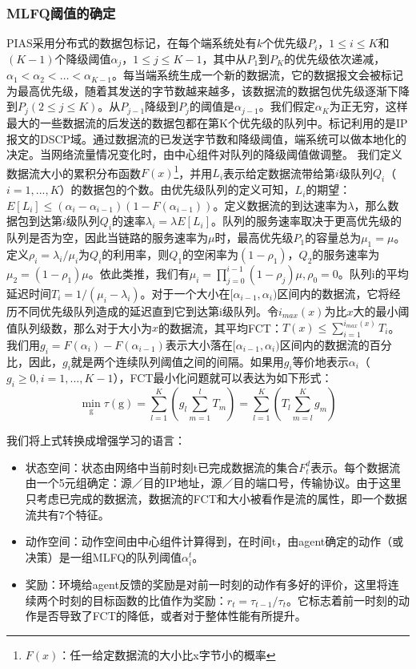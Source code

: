 \subsubsection{MLFQ阈值的确定}
PIAS采用分布式的数据包标记，在每个端系统处有$k$个优先级$P_i$，$1 \leq i \leq K$和$(K-1)$个降级阈值$\alpha_j$，$1 \leq j \leq K-1$，其中从$P_1$到$P_K$的优先级依次递减，$\alpha_1 < \alpha_2 < … < \alpha_{K-1}$。每当端系统生成一个新的数据流，它的数据报文会被标记为最高优先级，随着其发送的字节数越来越多，该数据流的数据包优先级逐渐下降到$P_j (2 \leq j \leq K)$。从$P_{j-1}$降级到$P_j$的阈值是$\alpha_{j-1}$。我们假定$\alpha_K$为正无穷，这样最大的一些数据流的后发送的数据包都在第K个优先级的队列中。标记利用的是IP报文的DSCP域。通过数据流的已发送字节数和降级阈值，端系统可以做本地化的决定。当网络流量情况变化时，由中心组件对队列的降级阈值做调整。
我们定义数据流大小的累积分布函数$F(x)$\footnote{$F(x)$：任一给定数据流的大小比x字节小的概率}，并用$L_i$表示给定数据流带给第$i$级队列$Q_i$（$i = 1, ..., K$）的数据包的个数。由优先级队列的定义可知，$L_i$的期望：$E[L_i] \leq (\alpha_i - \alpha_{i-1})(1-F(\alpha_{i-1}))$。定义数据流的到达速率为$\lambda$，那么数据包到达第$i$级队列$Q_i$的速率$\lambda_i = \lambda E[L_i]$。队列的服务速率取决于更高优先级的队列是否为空，因此当链路的服务速率为$\mu$时，最高优先级$P_1$的容量总为$\mu_1 = \mu$。定义$\rho_i = \lambda_i / \mu_i$为$Q_i$的利用率，则$Q_1$的空闲率为$(1-\rho_1)$，$Q_2$的服务速率为$\mu_2 = (1-\rho_1)\mu$。依此类推，我们有$\mu_i = \prod_{j=0}^{i-1} (1-\rho_j) \mu, \rho_0 = 0$。队列i的平均延迟时间$T_i = 1/(\mu_i - \lambda_i)$。对于一个大小在$[\alpha_{i-1},\alpha_i)$区间内的数据流，它将经历不同优先级队列造成的延迟直到它到达第i级队列。令$i_{max}(x)$为比$x$大的最小阈值队列级数，那么对于大小为$x$的数据流，其平均FCT：$T(x) \leq \sum_{i=1}^{i_{max}(x)}T_i$。我们用$g_i = F(\alpha_i)-F(\alpha_{i-1})$表示大小落在$[\alpha_{i-1},\alpha_i)$区间内的数据流的百分比，因此，$g_i$就是两个连续队列阈值之间的间隔。如果用$g_i$等价地表示$\alpha_i$（$g_i \geq 0, i = 1, ..., K-1$），FCT最小化问题就可以表达为如下形式：
\begin{equation}
\label{eq:target}
    \min_{\text{g}} \tau(\text{g}) = \sum_{l=1}^{K}(g_l \sum_{m=1}^{l}T_m) = \sum_{l=1}^K(T_l \sum_{m=l}^K g_m) 
\end{equation}

我们将上式转换成增强学习的语言：
\begin{itemize}
    \item 状态空间：状态由网络中当前时刻t已完成数据流的集合$F_t^d$表示。每个数据流由一个5元组确定：源／目的IP地址，源／目的端口号，传输协议。由于这里只考虑已完成的数据流，数据流的FCT和大小被看作是流的属性，即一个数据流共有7个特征。
    \item 动作空间：动作空间由中心组件计算得到，在时间t，由agent确定的动作（或决策）是一组MLFQ的队列阈值${\alpha_i^t}$。
    \item 奖励：环境给agent反馈的奖励是对前一时刻的动作有多好的评价，这里将连续两个时刻的目标函数的比值作为奖励：$r_t = \tau_{t-1} / \tau_{t}$。它标志着前一时刻的动作是否导致了FCT的降低，或者对于整体性能有所提升。
\end{itemize}

